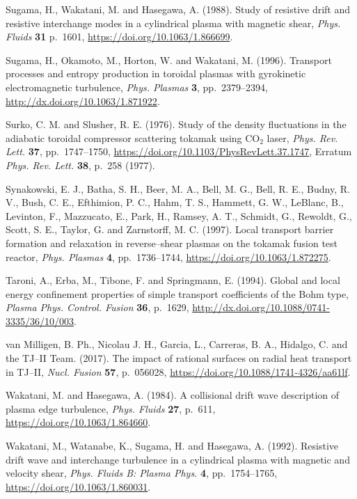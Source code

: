 \documentclass[a4paper,openany,12pt]{book}
\begin{document}
{\begin{thebibliography}{100}
\bibitem{}
Sugama, H., Wakatani, M. and Hasegawa, A. (1988). Study of resistive drift and resistive interchange modes in a cylindrical plasma with magnetic shear, \emph{Phys. Fluids} \textbf{31} p.~1601, \url{https://doi.org/10.1063/1.866699}.

\bibitem{}
Sugama, H., Okamoto, M., Horton, W. and Wakatani, M. (1996). Transport processes and entropy production in toroidal plasmas with gyrokinetic electromagnetic turbulence, \emph{Phys. Plasmas} \textbf{3}, pp.~2379--2394, \url{http://dx.doi.org/10.1063/1.871922}.

Surko, C. M. and Slusher, R. E. (1976). Study of the density fluctuations in the adiabatic toroidal compressor scattering tokamak using CO$_2$ laser, {\em Phys. Rev. Lett.} \textbf{37}, pp.~1747--1750, 
\url{https://doi.org/10.1103/PhysRevLett.37.1747}, Erratum \emph{Phys. Rev. Lett.} \textbf{38}, p.~258 (1977).

\bibitem{}
Synakowski, E. J., Batha, S. H., Beer, M. A., Bell, M. G., Bell, R. E., Budny, R. V., Bush, C. E., Efthimion, P. C., Hahm, T. S., Hammett, G. W., LeBlanc, B., Levinton, F., Mazzucato, E., Park, H., Ramsey, A. T., Schmidt, G., Rewoldt, G., Scott, S. E., Taylor, G. and Zarnstorff, M. C.  (1997). Local transport barrier formation and relaxation in reverse--shear plasmas on the tokamak fusion test reactor, {\em Phys. Plasmas} 
\textbf{4}, pp.~1736--1744, \url{https://doi.org/10.1063/1.872275}.

\bibitem{}
Taroni, A., Erba, M., Tibone, F. and Springmann, E. (1994). Global and local energy confinement properties of simple transport coefficients of the Bohm type, \emph{Plasma Phys. Control. Fusion} \textbf{36}, p.~1629, 
\url{http://dx.doi.org/10.1088/0741-3335/36/10/003}.

\bibitem{}
van Milligen, B. Ph., Nicolau J. H., Garcia, L., Carreras, B. A., Hidalgo, C. and the TJ--II Team. (2017). The impact of rational surfaces on radial heat transport in TJ--II, \emph{Nucl. Fusion} \textbf{57}, p.~056028, \url{https://doi.org/10.1088/1741-4326/aa61lf}.

\bibitem{}
Wakatani, M. and Hasegawa, A. (1984). A collisional drift wave description of plasma edge turbulence, {\em Phys. Fluids} \textbf{27}, p.~611, \url{https://doi.org/10.1063/1.864660}.

Wakatani, M., Watanabe, K., Sugama, H. and Hasegawa, A. (1992). Resistive drift wave and interchange turbulence in a cylindrical plasma with magnetic and velocity shear,
{\em Phys. Fluids B: Plasma Phys.} \textbf{4}, pp.~1754--1765, 
\url{https://doi.org/10.1063/1.860031}.


\end{thebibliography}}
\end{document}
